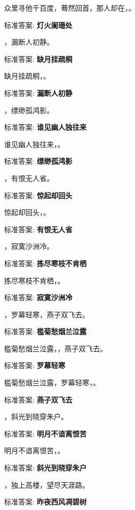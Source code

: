 \documentclass[12pt, a4paper, addpoints]{exam}
\begin{document}
\begin{questions}
\question[1] 众里寻他千百度，蓦然回首，那人却在，\uline{\qquad\qquad\qquad}。

标准答案: \textbf{灯火阑珊处}

\question[1] \uline{\qquad\qquad\qquad}，漏断人初静。

标准答案: \textbf{缺月挂疏桐}

\question[1] 缺月挂疏桐，\uline{\qquad\qquad\qquad}。

标准答案: \textbf{漏断人初静}

\question[1] \uline{\qquad\qquad\qquad}，缥缈孤鸿影。

标准答案: \textbf{谁见幽人独往来}

\question[1] 谁见幽人独往来，\uline{\qquad\qquad\qquad}。

标准答案: \textbf{缥缈孤鸿影}

\question[1] \uline{\qquad\qquad\qquad}，有恨无人省。

标准答案: \textbf{惊起却回头}

\question[1] 惊起却回头，\uline{\qquad\qquad\qquad}。

标准答案: \textbf{有恨无人省}

\question[1] \uline{\qquad\qquad\qquad}，寂寞沙洲冷。

标准答案: \textbf{拣尽寒枝不肯栖}

\question[1] 拣尽寒枝不肯栖，\uline{\qquad\qquad\qquad}。

标准答案: \textbf{寂寞沙洲冷}

\question[1] \uline{\qquad\qquad\qquad}，罗幕轻寒，燕子双飞去。

标准答案: \textbf{槛菊愁烟兰泣露}

\question[1] 槛菊愁烟兰泣露，\uline{\qquad\qquad\qquad}，燕子双飞去。

标准答案: \textbf{罗幕轻寒}

\question[1] 槛菊愁烟兰泣露，罗幕轻寒，\uline{\qquad\qquad\qquad}。

标准答案: \textbf{燕子双飞去}

\question[1] \uline{\qquad\qquad\qquad}，斜光到晓穿朱户。

标准答案: \textbf{明月不谙离恨苦}

\question[1] 明月不谙离恨苦，\uline{\qquad\qquad\qquad}。

标准答案: \textbf{斜光到晓穿朱户}

\question[1] \uline{\qquad\qquad\qquad}，独上高楼，望尽天涯路。

标准答案: \textbf{昨夜西风凋碧树}


\end{questions}
\end{document}
